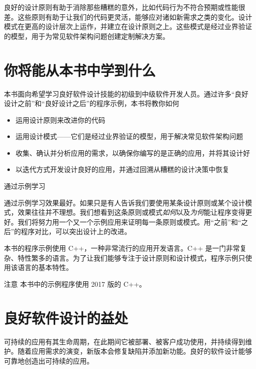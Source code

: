
良好的设计原则有助于消除那些糟糕的意外，比如代码行为不符合预期或性能很差。这些原则有助于让我们的代码更灵活，能够应对诸如新需求之类的变化。设计模式在更高的设计层次上运作，并建立在设计原则之上。这些模式是经过业界验证的模型，用于为常见软件架构问题创建定制解决方案。

\section{你将能从本书中学到什么}

本书面向希望学习良好软件设计技能的初级到中级软件开发人员。通过许多“良好设计之前”和“良好设计之后”的程序示例，本书将教你如何

\begin{itemize}
\item 运用设计原则来改进你的代码
\item 运用设计模式——它们是经过业界验证的模型，用于解决常见软件架构问题
\item 收集、确认并分析应用的需求，以确保你编写的是正确的应用，并将其设计好
\item 以迭代方式开发设计良好的应用，并通过回溯从糟糕的设计决策中恢复
\end{itemize}

\begin{mySidebar}{通过示例学习}

通过示例学习效果最好。如果只是有人告诉我们要使用某条设计原则或某个设计模式，效果往往并不理想。我们想看到这条原则或模式\emph{如何}以及\emph{为何}能让程序变得更好。我们将努力用一个又一个示例应用来证明每一条原则或模式。用“之前”和“之后”的程序对比，可以突出设计上的改进。
\end{mySidebar}

本书的程序示例使用 C++，一种非常流行的应用开发语言。C++ 是一门非常复杂、特性繁多的语言。为了让我们能够专注于设计原则和设计模式，程序示例只使用该语言的基本特性。

\begin{myWarning}{注意}
本书中的示例程序使用 2017 版的 C++。
\end{myWarning}


\section{良好软件设计的益处}

可持续的应用有其生命周期，在此期间它被部署、被客户成功使用，并持续得到维护。随着应用需求的演变，新版本会修复缺陷并添加新功能。良好的软件设计能够可靠地创造出可持续的应用。

